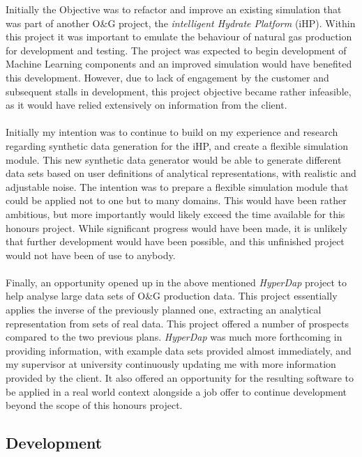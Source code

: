 \documentclass[main.tex]{subfiles}
\begin{document}
      Initially the Objective was to refactor and improve an existing simulation that was part of another O\&G  project, the \textit{intelligent Hydrate Platform} (iHP). Within this project it was important to emulate the behaviour of natural gas production for development and testing. The project was expected to begin development of Machine Learning components and an improved simulation would have benefited this development. However, due to lack of engagement by the customer and subsequent stalls in development, this project objective became rather infeasible, as it would have relied extensively on information from the client.
      \\\\
      Initially my intention was to continue to build on my experience and research regarding synthetic data generation for the iHP, and create a flexible simulation module. This new synthetic data generator would be able to generate different data sets based on user definitions of analytical representations, with realistic and adjustable noise. The intention was to prepare a flexible simulation module that could be applied not to one but to many domains. This would have been rather ambitious, but more importantly would likely exceed the time available for this honours project. While significant progress would have been made, it is unlikely that further development would have been possible, and this unfinished project would not have been of use to anybody.
      \\\\
      Finally, an opportunity opened up in the above mentioned \textit{HyperDap} project to help analyse large data sets of O\&G production data. This project essentially applies the inverse of the previously planned one, extracting an analytical representation from sets of real data. This project offered a number of prospects compared to the two previous plans. \textit{HyperDap} was much more forthcoming in providing information, with example data sets provided almost immediately, and my supervisor at university continuously updating me with more information provided by the client. It also offered an opportunity for the resulting software to be applied in a real world context alongside a job offer to continue development beyond the scope of this honours project.
    
    \subsection{Development}
    
\end{document}
